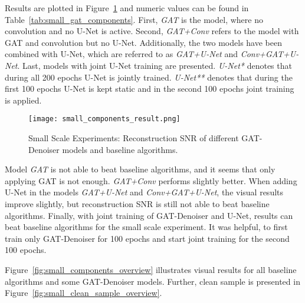 Results are plotted in Figure~\ref{fig:small_components} and numeric values can be found in Table~\ref{tab:small_gat_components}.
First, \textit{GAT} is the model, where no convolution and no U-Net is active. 
Second, \textit{GAT+Conv} refers to the model with GAT and convolution but no U-Net.
Additionally, the two models have been combined with U-Net, which are referred to as 
\textit{GAT+U-Net} and \textit{Conv+GAT+U-Net}.
Last, models with joint U-Net training are presented.
\textit{U-Net*} denotes that during all 200 epochs U-Net is jointly trained.
\textit{U-Net**} denotes that during the first 100 epochs U-Net is kept static 
and in the second 100 epochs  joint training is applied.


\begin{figure}[H]
  \centering
  
  \texttt{[image: small\_components\_result.png]}
  \caption{Small Scale Experiments: Reconstruction SNR of different GAT-Denoiser models and baseline algorithms.}
  \label{fig:small_components}
\end{figure}

Model \textit{GAT} is not able to beat baseline algorithms, and it seems that only applying GAT is not enough.
\textit{GAT+Conv} performs slightly better. When adding U-Net in the models \textit{GAT+U-Net}  and \textit{Conv+GAT+U-Net},
the visual results improve slightly, but reconstruction SNR is still not able to beat baseline algorithms.
Finally, with joint training of GAT-Denoiser and U-Net, 
results can beat baseline algorithms for the small scale experiment. It was helpful, to first train only GAT-Denoiser for 100 epochs 
and start joint training for the second 100 epochs.

Figure~\ref{fig:small_components_overview} illustrates visual results for all baseline algorithms and some GAT-Denoiser models.
Further, clean sample is presented in Figure~\ref{fig:small_clean_sample_overview}.

